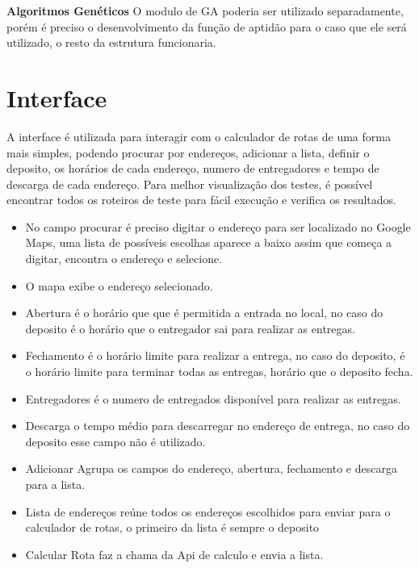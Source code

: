 \textbf{Algoritmos Genéticos} O modulo de GA poderia ser utilizado separadamente, porém é preciso o desenvolvimento da função de aptidão para o caso que ele será utilizado, o resto da estrutura funcionaria.

\section{Interface}
A interface é utilizada para interagir com o calculador de rotas de uma forma mais simples, podendo procurar por endereços, adicionar a lista, definir o deposito, os horários de cada endereço, numero de entregadores e tempo de descarga de cada endereço. Para melhor visualização dos testes, é possível encontrar todos os roteiros de teste para fácil execução e verifica os resultados.

\begin{center}
	\label{fig:Interface}
\end{center}


\begin{itemize}
	\item No campo procurar é preciso digitar o endereço para ser localizado no Google Maps, uma lista de possíveis escolhas aparece a baixo assim que começa a digitar, encontra o endereço e selecione.
	\item O mapa exibe o endereço selecionado.
	\item Abertura é o horário que que é permitida a entrada no local, no caso do deposito é o horário que o entregador sai para realizar as entregas.
	\item Fechamento é o horário limite para realizar a entrega, no caso do deposito, é o horário limite para terminar todas as entregas, horário que o deposito fecha.
	\item Entregadores é o numero de entregados disponível para realizar as entregas.
	\item Descarga o tempo médio para descarregar no endereço de entrega, no caso do deposito esse campo não é utilizado.
	\item Adicionar Agrupa os campos do endereço, abertura, fechamento e descarga para a lista.
	\item Lista de endereços reúne todos os endereços escolhidos para enviar para o calculador de rotas, o primeiro da lista é sempre o deposito
	\item Calcular Rota faz a chama da Api de calculo e envia a lista.
\end{itemize}

